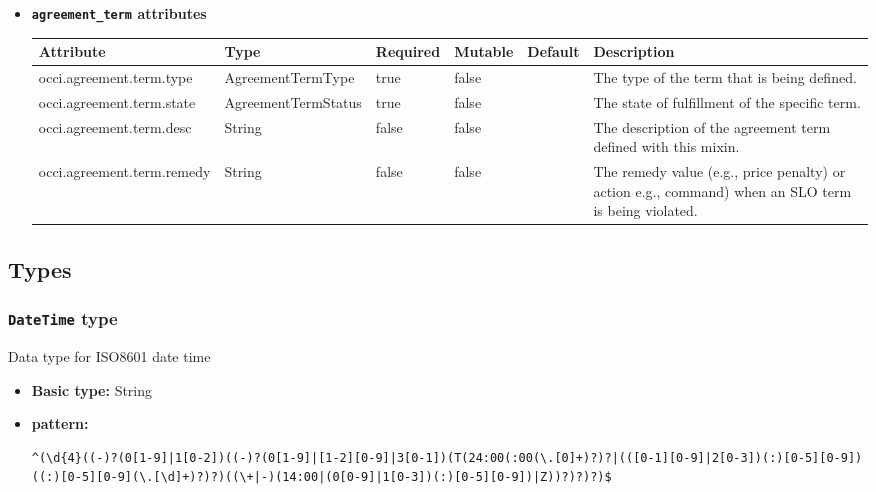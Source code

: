 \begin{itemize}
\item \textbf{\texttt{agreement\_term} attributes}

\begin{tabularx}{\textwidth}{|l|l|p{1.4cm}|p{1.3cm}|l|X|}
  \hline
  \textbf{Attribute} & \textbf{Type} & \textbf{Required} & \textbf{Mutable} & \textbf{Default} & \textbf{Description} \\
  \hline  
  occi.agreement.term.type & AgreementTermType & true & false &  & The type of the term that is being defined. \\
  \hline
  occi.agreement.term.state & AgreementTermStatus & true & false &  & The state of fulfillment of the specific term. \\
  \hline
  occi.agreement.term.desc & String & false & false &  & The description of the agreement term defined with this mixin. \\
  \hline
  occi.agreement.term.remedy & String & false & false &  & The remedy value (e.g., price penalty) or action e.g., command) when an SLO term is being violated. \\
  \hline
\end{tabularx}
\end{itemize}


\subsection{Types}
\subsubsection{\texttt{DateTime} type}
Data type for ISO8601 date time
\begin{itemize}
\item \textbf{Basic type:} String
	\item \textbf{pattern:} \begin{verbatim}^(\d{4}((-)?(0[1-9]|1[0-2])((-)?(0[1-9]|[1-2][0-9]|3[0-1])(T(24:00(:00(\.[0]+)?)?|(([0-1][0-9]|2[0-3])(:)[0-5][0-9])((:)[0-5][0-9](\.[\d]+)?)?)((\+|-)(14:00|(0[0-9]|1[0-3])(:)[0-5][0-9])|Z))?)?)?)$\end{verbatim}
\end{itemize}
